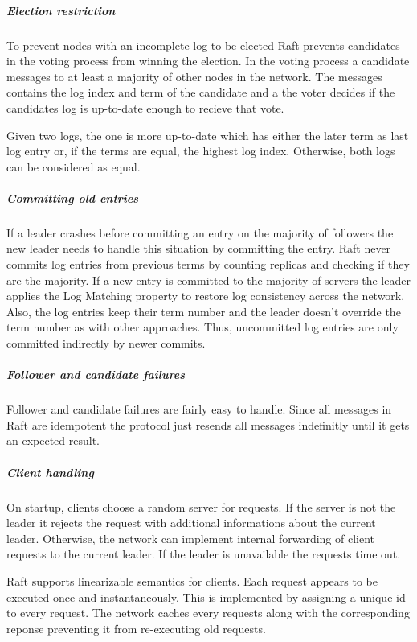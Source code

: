\subparagraph{Election restriction}
To prevent nodes with an incomplete log to be elected
Raft prevents candidates in the voting process from winning
the election. In the voting process a candidate messages
to at least a majority of other nodes in the network.
The messages contains the log index and term of the candidate
and a the voter decides if the candidates log is up-to-date
enough to recieve that vote.~\cite{ongaro2014search}

\begin{defi}
  Given two logs, the one is more up-to-date which has
  either the later term as last log entry or, if the terms
  are equal, the highest log index. Otherwise, both logs
  can be considered as equal.
\end{defi}

\subparagraph{Committing old entries}
If a leader crashes before committing an entry on the
majority of followers the new leader needs to handle
this situation by committing the entry. Raft never commits
log entries from previous terms by counting replicas and
checking if they are the majority. If a new entry is committed
to the majority of servers the leader applies the Log Matching
property to restore log consistency across the network.
Also, the log entries keep their term number and the
leader doesn't override the term number as with other
approaches. Thus, uncommitted log entries are only
committed indirectly by newer commits.~\cite{ongaro2014search}

\subparagraph{Follower and candidate failures}
Follower and candidate failures are fairly easy to handle.
Since all messages in Raft are idempotent the protocol
just resends all messages indefinitly until it gets
an expected result.~\cite{ongaro2014search}

\subparagraph{Client handling}
On startup, clients choose a random server for
requests. If the server is not the leader it rejects
the request with additional informations about the current leader.
Otherwise, the network can implement internal forwarding of client
requests to the current leader. If the leader is unavailable the
requests time out.~\cite{ongaro2014consensus}

Raft supports linearizable semantics for clients. Each request
appears to be executed once and instantaneously. This is implemented
by assigning a unique id to every request. The network
caches every requests along with the corresponding reponse preventing
it from re-executing old requests.~\cite{ongaro2014consensus}


